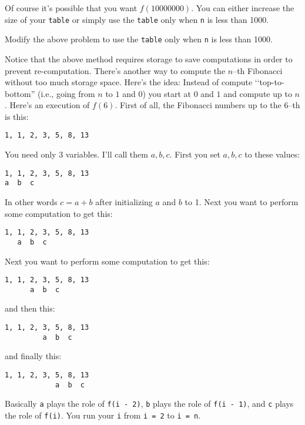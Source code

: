 Of course it's possible that you want $f(10000000)$.
You can either increase the size of your \verb!table!
or simply use the \verb!table! only when \verb!n! is less than 1000.

\newpage
\begin{ex}
Modify the above problem to use the \verb!table! only when 
\verb!n! is less than 1000.
\end{ex}


\begin{comment}
\newpage
\begin{ex}
Note that we use \verb!table[5]! to store $f(5)$, i.e.,
\verb!table[0, ..., 999]! corresponds to 
$f(0), ..., f(999)$.
What if you want to store 
$f(10)$, ..., $f(1009)$ in \verb!table[0,...,999]! instead?
\end{ex}
\end{comment}

\newpage
Notice that the above method requires storage to save computations
in order to prevent re-computation.
There's another way to compute the $n$--th Fibonacci without too much 
storage space.
Here's the idea:
Instead of compute \lq\lq top-to-bottom''
(i.e., going from $n$ to $1$ and $0$)
you start at $0$ and $1$ and compute up to $n$.
Here's an execution of $f(6)$.
First of all, the Fibonacci numbers up to the $6$--th is this:
\begin{Verbatim}[frame=single, fontsize=\footnotesize]
1, 1, 2, 3, 5, 8, 13
\end{Verbatim}
You need only 3 variables.
I'll call them $a, b, c$.
First you set $a,b,c$ to these values:
\begin{Verbatim}[frame=single, fontsize=\footnotesize]
1, 1, 2, 3, 5, 8, 13
a  b  c
\end{Verbatim}
In other words $c = a + b$ after initializing $a$ and $b$ to 1.
Next you want to perform some computation to get this:
\begin{Verbatim}[frame=single, fontsize=\footnotesize]
1, 1, 2, 3, 5, 8, 13
   a  b  c
\end{Verbatim}
Next you want to perform some computation to get this:
\begin{Verbatim}[frame=single, fontsize=\footnotesize]
1, 1, 2, 3, 5, 8, 13
      a  b  c
\end{Verbatim}
and then this:
\begin{Verbatim}[frame=single, fontsize=\footnotesize]
1, 1, 2, 3, 5, 8, 13
         a  b  c
\end{Verbatim}
and finally this:
\begin{Verbatim}[frame=single, fontsize=\footnotesize]
1, 1, 2, 3, 5, 8, 13
            a  b  c
\end{Verbatim}
Basically \verb!a! plays the role of \verb!f(i - 2)!, 
\verb!b! plays the role of \verb!f(i - 1)!, 
and \verb!c! plays the role of \verb!f(i)!.
You run your \verb!i! from \verb!i = 2! to \verb!i = n!.

